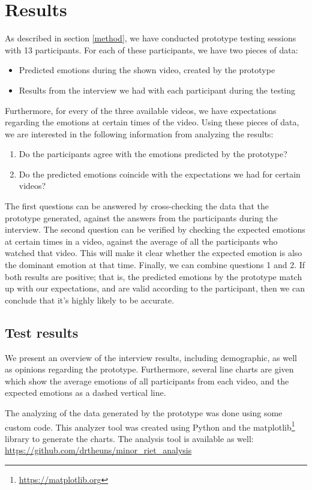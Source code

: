\documentclass[sigconf]{acmart}
\begin{document}
\section{Results} \label{results}
As described in section \ref{method}, we have conducted prototype testing sessions with 13 participants.
For each of these participants, we have two pieces of data:
\begin{itemize}
    \item{Predicted emotions during the shown video, created by the prototype}
    \item{Results from the interview we had with each participant during the testing}
\end{itemize}
Furthermore, for every of the three available videos, we have expectations regarding the emotions at certain
times of the video. Using these pieces of data, we are interested in the following information from analyzing
the results:
\begin{enumerate}
    \item{Do the participants agree with the emotions predicted by the prototype?}
    \item{Do the predicted emotions coincide with the expectations we had for certain videos?}
\end{enumerate}
The first questions can be answered by cross-checking the data that the prototype generated, against the
answers from the participants during the interview. The second question can be verified by checking the
expected emotions at certain times in a video, against the average of all the participants who watched that
video. This will make it clear whether the expected emotion is also the dominant emotion at that time.
Finally, we can combine questions 1 and 2. If both results are positive; that is, the predicted emotions by the
prototype match up with our expectations, and are valid according to the participant, then we can conclude
that it's highly likely to be accurate.

\subsection{Test results}
We present an overview of the interview results, including demographic, as well as opinions regarding the
prototype. Furthermore, several line charts are given which show
the average emotions of all participants from each video, and the expected emotions as a dashed vertical line.

The analyzing of the data generated by the prototype was done using some custom code. This analyzer tool was
created using Python and the matplotlib\footnote{\url{https://matplotlib.org}} library to generate the charts.
The analysis tool is available as well: \url{https://github.com/drtheuns/minor_riet_analysis}
\end{document}
